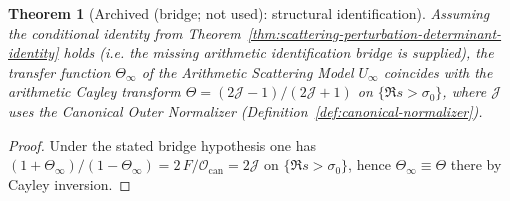 \documentclass[11pt]{article}
\newtheorem{theorem}{Theorem}
\theoremstyle{definition}
\theoremstyle{remark}
\theoremstyle{definition}
\begin{document}
\begin{theorem}[Archived (bridge; not used): structural identification]\label{thm:identification}
Assuming the conditional identity from Theorem~\ref{thm:scattering-perturbation-determinant-identity} holds (i.e. the missing arithmetic identification bridge is supplied), the transfer function $\Theta_\infty$ of the Arithmetic Scattering Model $U_\infty$ coincides with the arithmetic Cayley transform $\Theta = (2\mathcal J - 1)/(2\mathcal J + 1)$ on $\{\Re s>\sigma_0\}$, where $\mathcal J$ uses the Canonical Outer Normalizer (Definition~\ref{def:canonical-normalizer}).
\end{theorem}
\begin{proof}
Under the stated bridge hypothesis one has $(1+\Theta_\infty)/(1-\Theta_\infty)=2\,F/\mathcal O_{\mathrm{can}}=2\mathcal J$ on $\{\Re s>\sigma_0\}$, hence $\Theta_\infty\equiv\Theta$ there by Cayley inversion.
\end{proof}
\end{document}
